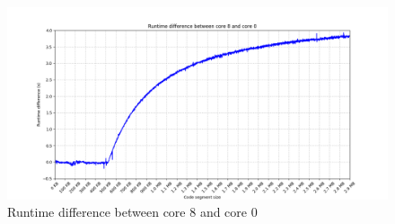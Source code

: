 \documentclass[a4paper]{jpconf}
\begin{document}
\begin{figure}[ht]
\begin{center}
\includegraphics[scale=0.40]{images/runtime_difference.png}
\end{center}
\caption{\label{fig:runtime-difference} Runtime difference between core 8 and core 0}
\end{figure}


\end{document}
